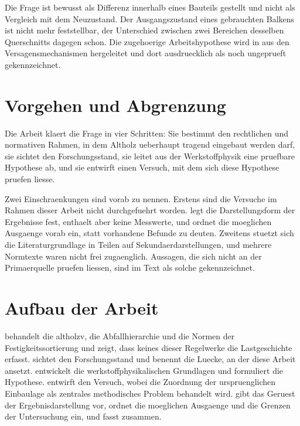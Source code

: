 Die Frage ist bewusst als Differenz innerhalb eines Bauteils gestellt und
nicht als Vergleich mit dem Neuzustand. Der Ausgangszustand eines gebrauchten
Balkens ist nicht mehr feststellbar, der Unterschied zwischen zwei Bereichen
desselben Querschnitts dagegen schon. Die zugehoerige Arbeitshypothese wird in
 aus den Versagensmechanismen hergeleitet und dort ausdruecklich
als noch ungeprueft gekennzeichnet.

\section{Vorgehen und Abgrenzung}
\label{sec:scope}

Die Arbeit klaert die Frage in vier Schritten: Sie bestimmt den rechtlichen
und normativen Rahmen, in dem Altholz ueberhaupt tragend eingebaut werden
darf, sie sichtet den Forschungsstand, sie leitet aus der Werkstoffphysik eine
pruefbare Hypothese ab, und sie entwirft einen Versuch, mit dem sich diese
Hypothese pruefen liesse.

Zwei Einschraenkungen sind vorab zu nennen. Erstens sind die Versuche im
Rahmen dieser Arbeit nicht durchgefuehrt worden.  legt die
Darstellungsform der Ergebnisse fest, enthaelt aber keine Messwerte, und
 ordnet die moeglichen Ausgaenge vorab ein, statt
vorhandene Befunde zu deuten. Zweitens stuetzt sich die Literaturgrundlage in
Teilen auf Sekundaerdarstellungen, und mehrere Normtexte waren nicht frei
zugaenglich. Aussagen, die sich nicht an der Primaerquelle pruefen liessen,
sind im Text als solche gekennzeichnet.

\section{Aufbau der Arbeit}
\label{sec:structure}

 behandelt die \acrshort{altholzv}, die Abfallhierarchie
und die Normen der Festigkeitssortierung und zeigt, dass keines dieser
Regelwerke die Lastgeschichte erfasst.  sichtet den
Forschungsstand und benennt die Luecke, an der diese Arbeit ansetzt.
 entwickelt die werkstoffphysikalischen Grundlagen und
formuliert die Hypothese.  entwirft den Versuch, wobei die
Zuordnung der urspruenglichen Einbaulage als zentrales methodisches Problem
behandelt wird.  gibt das Geruest der Ergebnisdarstellung
vor,  ordnet die moeglichen Ausgaenge und die Grenzen der
Untersuchung ein, und  fasst zusammen.
